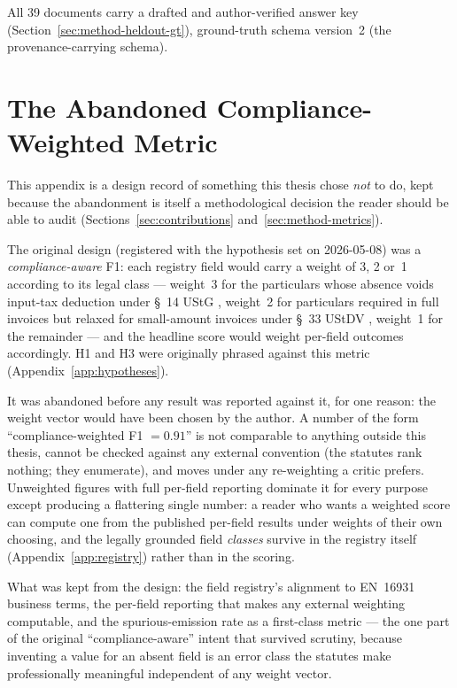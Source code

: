 All 39 documents carry a drafted and author-verified answer key
(Section~\ref{sec:method-heldout-gt}), ground-truth schema version~2 (the provenance-carrying
schema).







\chapter{The Abandoned Compliance-Weighted Metric}
\label{app:metric-spec}

This appendix is a design record of something this thesis chose \emph{not} to do, kept
because the abandonment is itself a methodological decision the reader should be able
to audit (Sections~\ref{sec:contributions} and~\ref{sec:method-metrics}).

The original design (registered with the hypothesis set on 2026-05-08) was a
\emph{compliance-aware} \ac{F1}: each registry field would carry a weight of 3, 2
or~1 according to its legal class --- weight~3 for the particulars whose absence
voids input-tax deduction under \S~14 \ac{UStG} \parencite{ustg14}, weight~2 for
particulars required in full invoices but relaxed for small-amount invoices under
\S~33 \ac{UStDV} \parencite{ustdv33}, weight~1 for the remainder --- and the headline
score would weight per-field outcomes accordingly. H1 and H3 were originally phrased
against this metric (Appendix~\ref{app:hypotheses}).

It was abandoned before any result was reported against it, for one reason: the
weight vector would have been chosen by the author. A number of the form
``compliance-weighted \ac{F1} $= 0.91$'' is not comparable to anything outside this
thesis, cannot be checked against any external convention (the statutes rank nothing;
they enumerate), and moves under any re-weighting a critic prefers. Unweighted
figures with full per-field reporting dominate it for every purpose except producing
a flattering single number: a reader who wants a weighted score can compute one from
the published per-field results under weights of their own choosing, and the
legally grounded field \emph{classes} survive in the registry itself
(Appendix~\ref{app:registry}) rather than in the scoring.

What was kept from the design: the field registry's alignment to \ac{EN}~16931
business terms, the per-field reporting that makes any external weighting computable,
and the spurious-emission rate as a first-class metric --- the one part of the
original ``compliance-aware'' intent that survived scrutiny, because inventing a
value for an absent field is an error class the statutes make professionally
meaningful independent of any weight vector.

